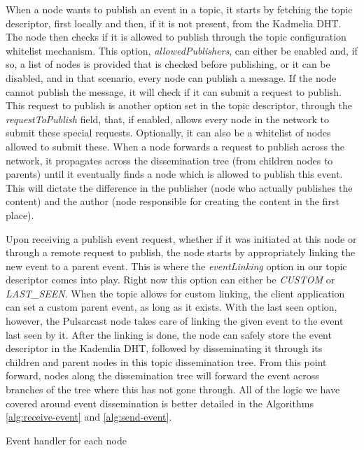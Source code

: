 When a node wants to publish an event in a topic, it starts by fetching the
topic descriptor, first locally and then, if it is not present, from the
Kadmelia DHT. The node then checks if it is allowed to publish through the
topic configuration whitelist mechanism. This option, \emph{allowedPublishers},
can either be enabled and, if so, a list of nodes is provided that is checked
before publishing, or it can be disabled, and in that scenario, every node can
publish a message. If the node cannot publish the message, it will check if it
can submit a request to publish. This request to publish is another option set
in the topic descriptor, through the \emph{requestToPublish} field, that, if
enabled, allows every node in the network to submit these special requests.
Optionally, it can also be a whitelist of nodes allowed to submit these. When a
node forwards a request to publish across the network, it propagates across the
dissemination tree (from children nodes to parents) until it eventually finds a
node which is allowed to publish this event. This will dictate the difference
in the publisher (node who actually publishes the content) and the author (node
responsible for creating the content in the first place).

Upon receiving a publish event request, whether if it was initiated at this
node or through a remote request to publish, the node starts by appropriately
linking the new event to a parent event. This is where the \emph{eventLinking}
option in our topic descriptor comes into play. Right now this option can
either be \emph{CUSTOM} or \emph{LAST\_SEEN}. When the topic allows for custom
linking, the client application can set a custom parent event, as long as it
exists. With the last seen option, however, the Pulsarcast node takes care of
linking the given event to the event last seen by it. After the linking is
done, the node can safely store the event descriptor in the Kademlia DHT,
followed by disseminating it through its children and parent nodes in this
topic dissemination tree. From this point forward, nodes along the
dissemination tree will forward the event across branches of the tree where
this has not gone through. All of the logic we have covered around event
dissemination is better detailed in the Algorithms \ref{alg:receive-event} and
\ref{alg:send-event}.

\vspace{8pt}
\begin{algorithm}
  \SetAlgoLined
  \caption{Event handler for each node}
    \label{alg:receive-event}
\end{algorithm}
\vspace{8pt}

